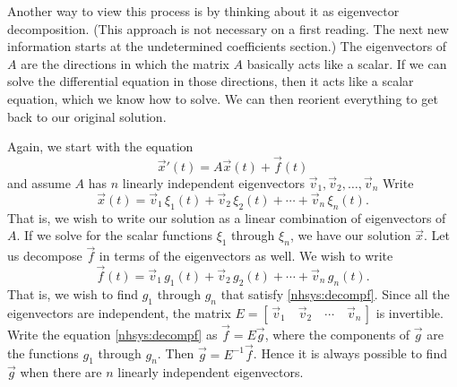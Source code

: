 \documentclass{ximera}
\begin{document}
Another way to view this process is by thinking about it as eigenvector decomposition. (This approach is not necessary on a first reading. The next new information starts at the undetermined coefficients section.) The eigenvectors of $A$ are the directions in which the matrix $A$ basically acts like a scalar. If we can solve the differential equation in those directions, then it acts like a scalar equation, which we know how to solve. We can then reorient everything to get back to our original solution. 

Again, we start with the equation
\begin{equation} \label{nhsys:ednhsys2}
    {\vec{x}}' (t) = A \vec{x}(t) + \vec{f}(t)
\end{equation}
and assume $A$ has $n$ linearly independent eigenvectors $\vec{v}_1, \vec{v}_2, \ldots, \vec{v}_n$ Write
\begin{equation} \label{nhsys:decompx}
    \vec{x}(t) = \vec{v}_1 \, \xi_1(t) + \vec{v}_2 \, \xi_2(t) + \cdots + \vec{v}_n \, \xi_n(t) .
\end{equation}
That is, we wish to write our solution as a linear combination of eigenvectors of $A$. If we solve for the scalar functions $\xi_1$ through $\xi_n$, we have our solution $\vec{x}$. Let us decompose $\vec{f}$ in terms of the eigenvectors as well.  We wish to write
\begin{equation} \label{nhsys:decompf}
    \vec{f}(t) = \vec{v}_1 \, g_1(t) +  \vec{v}_2 \, g_2(t) + \cdots + \vec{v}_n \, g_n(t) .
\end{equation}
That is, we wish to find $g_1$ through $g_n$ that satisfy \eqref{nhsys:decompf}.  Since all the eigenvectors are independent, the matrix $E = [\, \vec{v}_1 \quad \vec{v}_2 \quad \cdots \quad \vec{v}_n \,]$ is invertible.  Write the equation \eqref{nhsys:decompf} as $\vec{f} = E \vec{g}$, where the components of $\vec{g}$ are the functions $g_1$ through $g_n$. Then $\vec{g} = E^{-1} \vec{f}$. Hence it is always possible to find $\vec{g}$ when there are $n$ linearly independent eigenvectors.
\end{document}
